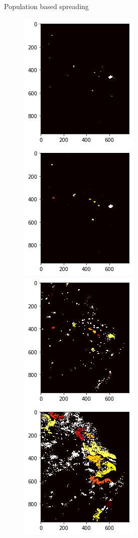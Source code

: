 \documentclass{beamer}
\begin{document}
\begin{frame}{Population based spreading}
  \begin{figure}
    \includegraphics[width = 0.34\linewidth]{pics/ntl/jzh/jzh4.png}
    \includegraphics[width = 0.34\linewidth]{pics/ntl/jzh/jzh3.png}
    \includegraphics[width = 0.34\linewidth]{pics/ntl/jzh/jzh2.png}
    \includegraphics[width = 0.34\linewidth]{pics/ntl/jzh/jzh1.png}
  \end{figure}
\end{frame}
\end{document}
